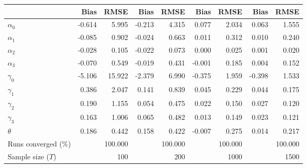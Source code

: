 
\begin{tabular}[t]{lrrrrrrrr}
\toprule
  & Bias & RMSE & Bias & RMSE & Bias & RMSE & Bias & RMSE\\
\midrule
$\alpha_{0}$ & -0.614 & 5.995 & -0.213 & 4.315 & 0.077 & 2.034 & 0.063 & 1.555\\
$\alpha_{1}$ & -0.085 & 0.902 & -0.024 & 0.663 & 0.011 & 0.312 & 0.010 & 0.240\\
$\alpha_{2}$ & -0.028 & 0.105 & -0.022 & 0.073 & 0.000 & 0.025 & 0.001 & 0.020\\
$\alpha_{3}$ & -0.070 & 0.549 & -0.019 & 0.431 & -0.001 & 0.185 & 0.004 & 0.152\\
$\gamma_{0}$ & -5.106 & 15.922 & -2.379 & 6.990 & -0.375 & 1.959 & -0.398 & 1.533\\
$\gamma_{1}$ & 0.386 & 2.047 & 0.141 & 0.839 & 0.045 & 0.229 & 0.044 & 0.175\\
$\gamma_{2}$ & 0.190 & 1.155 & 0.054 & 0.475 & 0.022 & 0.150 & 0.027 & 0.120\\
$\gamma_{3}$ & 0.163 & 1.006 & 0.065 & 0.482 & 0.013 & 0.149 & 0.023 & 0.121\\
$\theta$ & 0.186 & 0.442 & 0.158 & 0.422 & -0.007 & 0.275 & 0.014 & 0.217\\
Runs converged (\%) &  & 100.000 &  & 100.000 &  & 100.000 &  & 100.000\\
Sample size ($T$) &  & 100 &  & 200 &  & 1000 &  & 1500\\
\bottomrule
\end{tabular}
